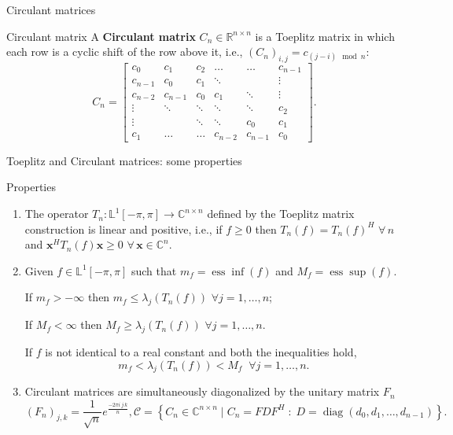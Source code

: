 \documentclass[aspectratio=169,xcolor=dvipsnames]{beamer}
\begin{document}
\begin{frame}{Circulant matrices}
	\begin{block}{Circulant matrix}
		A \textbf{Circulant matrix} $C_n \in \mathbb{R}^{n\times n}$ is a
		Toeplitz matrix in which each row is a cyclic shift of the row above it, i.e.,
		$(C_n)_{i,j} = c_{(j-i)\mod{n}}$:
		\begin{equation*}
			C_n = \begin{bmatrix}
				c_0 & c_1 & c_2 & \ldots & \ldots & c_{n-1} \\
				c_{n-1} & c_0 & c_1 & \ddots & & \vdots \\
				c_{n-2} & c_{n-1} & c_0 & c_1 & \ddots & \vdots \\
				\vdots & \ddots & \ddots & \ddots & \ddots & c_2 \\
				\vdots &  & \ddots & \ddots & c_0 & c_1 \\
				c_1 & \ldots & \ldots & c_{n-2} & c_{n-1} & c_0
			\end{bmatrix}.
		\end{equation*}
	\end{block}
\end{frame}

\begin{frame}{Toeplitz and Circulant matrices: some properties}
\begin{alertblock}{Properties}
\begin{enumerate}
	\item The operator $T_n : \mathbb{L}^1[-\pi,\pi] \rightarrow
	\mathbb{C}^{n\times n}$ defined by the Toeplitz matrix construction is linear and positive, i.e., if $f \geq 0$ then $T_n(f) = T_n(f)^H$
	$\forall \, n$ and $\mathbf{x}^H T_n(f)
	\mathbf{x} \geq 0$ $\forall \, \mathbf{x} \in \mathbb{C}^{n}$.
	\item Given $f \in \mathbb{L}^{1}[-\pi,\pi]$ such that $m_f =
	\operatorname{ess}\inf(f)$ and $M_f = \operatorname{ess}\sup(f)$. 
	
	If $m_f > -\infty$ then $m_f \leq \lambda_j(T_n(f))$ $\forall
	j=1,\ldots,n$;
	
	If $M_f < \infty$ then $M_f \geq \lambda_j(T_n(f))$
	$\forall j=1,\ldots,n$. 
	
	If $f$ is not identical to a real
	constant and both the inequalities hold,
	\begin{equation*}
		m_f < \lambda_j(T_n(f)) < M_f \;\; \forall j=1,\ldots,n.
	\end{equation*}
	
	\item Circulant matrices are simultaneously diagonalized by the unitary matrix $F_n$
	\begin{equation*}
		\left(F_n\right)_{j,k}=\frac{1}{\sqrt{n}}e^{\frac{-2\pi i\, j\,
			k}{n}}, \mathcal{C} = \left\lbrace C_n\in \mathbb{C}^{n\times n} \mid C_n=F D F^H \;:\; D =
		\operatorname{diag}(d_0,d_1,\ldots,d_{n-1}) \right\rbrace.
	\end{equation*}
\end{enumerate}
\end{alertblock}
\end{frame}
\end{document}
